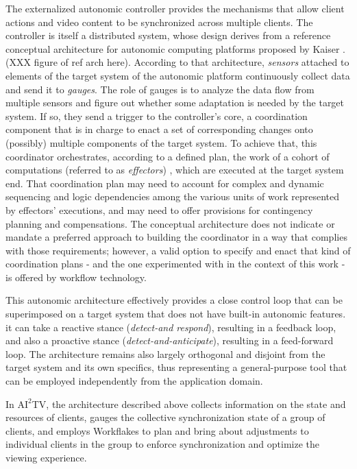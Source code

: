 \documentclass{sig-alternate}
\begin{document}
The externalized autonomic controller provides the mechanisms that
allow client actions and video content to be synchronized across
multiple clients. The controller is itself a distributed system, whose
design derives from a reference conceptual architecture for autonomic
computing platforms proposed by Kaiser \cite{refarch}.  (XXX figure of
ref arch here). According to that architecture, \emph{sensors} attached
to elements of the target system of the autonomic platform
continuously collect data and send it to \emph{gauges}.  The role of
gauges is to analyze the data flow from multiple sensors and figure
out whether some adaptation is needed by the target system. If so,
they send a trigger to the controller's core, a coordination component
that is in charge to enact a set of corresponding changes onto
(possibly) multiple components of the target system.  To achieve that,
this coordinator orchestrates, according to a defined plan, the work
of a cohort of computations (referred to as \emph{effectors}) , which are
executed at the target system end. That coordination plan may need to
account for complex and dynamic sequencing and logic dependencies
among the various units of work represented by effectors' executions,
and may need to offer provisions for contingency planning and
compensations. The conceptual architecture does not indicate or
mandate a preferred approach to building the coordinator in a way that
complies with those requirements; however, a valid option to specify
and enact that kind of coordination plans - and the one experimented
with in the context of this work - is offered by workflow technology.

This autonomic architecture effectively provides a close control loop
that can be superimposed on a target system that does not have
built-in autonomic features.  it can take a reactive stance
(\emph{detect-and respond}), resulting in a feedback loop, and also a
proactive stance (\emph{detect-and-anticipate}), resulting in a
feed-forward loop.  The architecture remains also largely orthogonal
and disjoint from the target system and its own specifics, thus
representing a general-purpose tool that can be employed independently
from the application domain.

In $\mathrm{AI}^2$TV, the architecture described above collects
information on the state and resources of clients, gauges the
collective synchronization state of a group of clients, and employs
Workflakes to plan and bring about adjustments to individual clients
in the group to enforce synchronization and optimize the viewing
experience.
\end{document}
